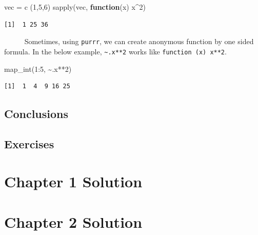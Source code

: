 \documentclass[
  letterpaper,
  DIV=11,
  numbers=noendperiod]{scrreprt}
\newenvironment{Shaded}{\begin{snugshade}}{\end{snugshade}}
\newcommand{\ControlFlowTok}[1]{\textcolor[rgb]{0.00,0.23,0.31}{\textbf{#1}}}
\newcommand{\DecValTok}[1]{\textcolor[rgb]{0.68,0.00,0.00}{#1}}
\newcommand{\FunctionTok}[1]{\textcolor[rgb]{0.28,0.35,0.67}{#1}}
\newcommand{\NormalTok}[1]{\textcolor[rgb]{0.00,0.23,0.31}{#1}}
\newcommand{\OtherTok}[1]{\textcolor[rgb]{0.00,0.23,0.31}{#1}}
\newcommand{\SpecialCharTok}[1]{\textcolor[rgb]{0.37,0.37,0.37}{#1}}
\begin{document}
\begin{Shaded}
\begin{Highlighting}[]
\NormalTok{vec }\OtherTok{=} \FunctionTok{c}\NormalTok{ (}\DecValTok{1}\NormalTok{,}\DecValTok{5}\NormalTok{,}\DecValTok{6}\NormalTok{)}
\FunctionTok{sapply}\NormalTok{(vec, }\ControlFlowTok{function}\NormalTok{(x) x}\SpecialCharTok{\^{}}\DecValTok{2}\NormalTok{)}
\end{Highlighting}
\end{Shaded}

\begin{verbatim}
[1]  1 25 36
\end{verbatim}

~~~~~ Sometimes, using \texttt{purrr}, we can create anonymous function
by one sided formula. In the below example,
\texttt{\textasciitilde{}.x**2} works like \texttt{function\ (x)\ x**2}.

\begin{Shaded}
\begin{Highlighting}[]
\FunctionTok{map\_int}\NormalTok{(}\DecValTok{1}\SpecialCharTok{:}\DecValTok{5}\NormalTok{, }\SpecialCharTok{\textasciitilde{}}\NormalTok{.x}\SpecialCharTok{**}\DecValTok{2}\NormalTok{)}
\end{Highlighting}
\end{Shaded}

\begin{verbatim}
[1]  1  4  9 16 25
\end{verbatim}

\section{Conclusions}\label{conclusions-3}

\section*{Exercises}\label{exercises-3}


\chapter{Chapter 1 Solution}\label{chapter-1-solution}

\chapter{Chapter 2 Solution}\label{chapter-2-solution}
\end{document}
